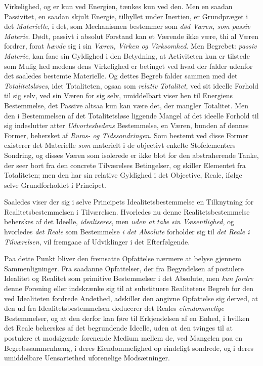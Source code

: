 Virkelighed, og er kun ved Energien, tænkes kun ved den. Men en saadan
Passivitet, en saadan skjult Energie, tilhyllet under Inertien, er
Grundpræget i det \emph{Materielle}, i det, som Mechanismen bestemmer som
\emph{død Væren, som passiv Materie}. Dødt, passivt i absolut Forstand kan et
Værende ikke være, thi al Væren fordrer, forat \emph{hævde} sig i sin
\emph{Væren, Virken og Virksomhed}. Men Begrebet: \emph{passiv Materie}, kan
faae sin Gyldighed i den Betydning, at Activiteten kun er tilstede som Mulig\-%
hed medens dens Virkelighed er betinget ved hvad der falder udenfor det
saaledes bestemte Materielle. Og dettes Begreb falder sammen med det
\emph{Totalitetsløses}, idet Totaliteten, ogsaa som \emph{relativ Totalitet},
ved sit ideelle Forhold til sig selv, ved sin Væren for sig selv, umiddelbart
viser hen til Energiens Bestemmelse, det Passive altsaa kun kan være det, der
mangler Totalitet. Men den i Bestemmelsen af det Totalitetsløse liggende
Mangel af det ideelle Forhold til sig indeslutter atter
\emph{Udvorteshedens} Bestemmelse, en Væren, bunden af dennes Former,
behersket af \emph{Rums- og Tidssondringen}. Som bestemt ved disse Former
existerer det Materielle \emph{som} materielt i de objectivt enkelte
Stofelementers Sondring, og disses Væren som isolerede er ikke blot for den
abstraherende Tanke, der seer bort fra den concrete Tilværelses Betingelser,
og skiller Elementet fra Totaliteten; men den har sin relative Gyldighed i det
Objective, Reale, ifølge selve Grundforholdet i Principet.

Saaledes viser der sig i selve Principets Idealitetsbestemmelse en Tilknytning
for Realitetsbestemmelsen i Tilværelsen. Hvorledes nu denne
Realitetsbestemmelse beherskes af det Ideelle, \emph{idealiseres}, men
\emph{uden at tabe sin Væsentlighed}, og hvorledes \emph{det Reale} som
Bestemmelse \emph{i det Absolute} forholder sig til \emph{det Reale i
Tilværelsen}, vil fremgaae af Udviklinger i det Efterfølgende.

Paa dette Punkt bliver den fremsatte Opfattelse nærmere at belyse gjennem
Sammenligninger. Fra saadanne Opfattelser, der fra Begyndelsen af postulere
Idealitet og Realitet som primitive Bestemmelser i det Absolute, men \emph{kun
fordre} denne Forening eller indskrænke sig til at substituere Realitetens
Begreb for den ved Idealiteten fordrede Andethed, adskiller den angivne
Opfattelse sig derved, at den ud fra Idealitetsbestemmelsen deducerer det
Reales \emph{eiendommelige} Bestemmelser, og at den derfor kan føre til
Erkjendelsen af en Enhed, i hvilken det Reale beherskes af det begrundende
Ideelle, uden at den tvinges til at postulere et modsigende forenende Medium
mellem de, ved Mangelen paa en Begrebssammenhæng, i deres Eiendommelighed op\-%
rindeligt sondrede, og i deres umiddelbare Uensartethed uforenelige
Modsætninger.

